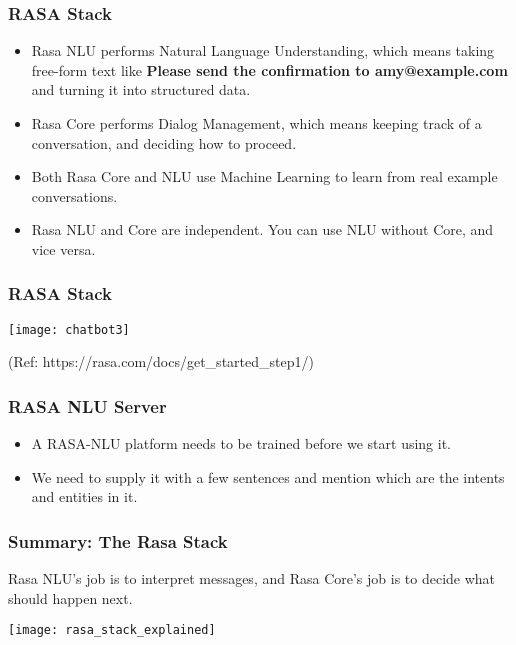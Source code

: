  \begin{frame}[fragile]\frametitle{RASA Stack}
\begin{itemize}
\item Rasa NLU performs Natural Language Understanding, which means taking free-form text like
{\bf Please send the confirmation to amy@example.com}
and turning it into structured data. 
\item Rasa Core performs Dialog Management, which means keeping track of a conversation, and deciding how to proceed. 
\item Both Rasa Core and NLU use Machine Learning to learn from real example conversations.
\item Rasa NLU and Core are independent. You can use NLU without Core, and vice versa.
\end{itemize}
\end{frame}

 \begin{frame}[fragile]\frametitle{RASA Stack}
\begin{center}
\texttt{[image: chatbot3]}
\end{center}

{\tiny (Ref: https://rasa.com/docs/get\_started\_step1/)}

\end{frame}


 \begin{frame}[fragile]\frametitle{RASA NLU Server}
\begin{itemize}
\item A RASA-NLU platform needs to be trained before we start using it. 
\item We need to supply it with a few sentences and mention which are the intents and entities in it.
\end{itemize}
\end{frame}


 \begin{frame}[fragile]\frametitle{Summary: The Rasa Stack}
Rasa NLU's job is to interpret messages, and Rasa Core's job is to decide what should happen next.

\begin{center}
\texttt{[image: rasa\_stack\_explained]}
\end{center}

\end{frame}


